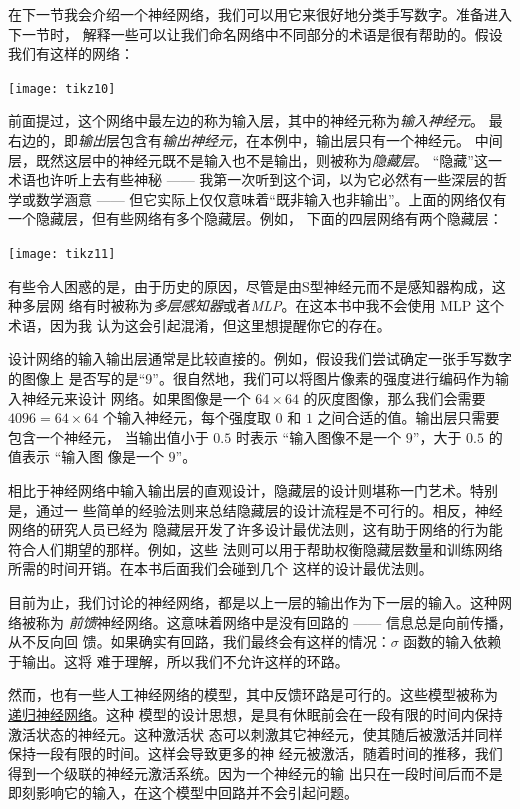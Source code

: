 在下一节我会介绍一个神经网络，我们可以用它来很好地分类手写数字。准备进入下一节时，
解释一些可以让我们命名网络中不同部分的术语是很有帮助的。假设我们有这样的网络：
\begin{center}
  \texttt{[image: tikz10]}
\end{center}

前面提过，这个网络中最左边的称为输入层，其中的神经元称为\emph{输入神经元}。
最右边的，即\emph{输出}层包含有\emph{输出神经元}，在本例中，输出层只有一个神经元。
中间层，既然这层中的神经元既不是输入也不是输出，则被称为\emph{隐藏层}。
“隐藏”这一术语也许听上去有些神秘 —— 我第一次听到这个词，以为它必然有一些深层的哲学或数学涵意 —— 
但它实际上仅仅意味着“既非输入也非输出”。上面的网络仅有一个隐藏层，但有些网络有多个隐藏层。例如，
下面的四层网络有两个隐藏层：
\begin{center}
  \texttt{[image: tikz11]}
\end{center}

有些令人困惑的是，由于历史的原因，尽管是由S型神经元而不是感知器构成，这种多层网
络有时被称为\emph{多层感知器}或者\emph{MLP}。在这本书中我不会使用 MLP 这个术语，因为我
认为这会引起混淆，但这里想提醒你它的存在。

设计网络的输入输出层通常是比较直接的。例如，假设我们尝试确定一张手写数字的图像上
是否写的是“9”。很自然地，我们可以将图片像素的强度进行编码作为输入神经元来设计
网络。如果图像是一个 $64 \times 64$ 的灰度图像，那么我们会需要 $4096 = 64 \times
64$ 个输入神经元，每个强度取 $0$ 和 $1$ 之间合适的值。输出层只需要包含一个神经元，
当输出值小于 $0.5$ 时表示 “输入图像不是一个 $9$”，大于 $0.5$ 的值表示 “输入图
像是一个 $9$”。

相比于神经网络中输入输出层的直观设计，隐藏层的设计则堪称一门艺术。特别是，通过一
些简单的经验法则来总结隐藏层的设计流程是不可行的。相反，神经网络的研究人员已经为
隐藏层开发了许多设计最优法则，这有助于网络的行为能符合人们期望的那样。例如，这些
法则可以用于帮助权衡隐藏层数量和训练网络所需的时间开销。在本书后面我们会碰到几个
这样的设计最优法则。

目前为止，我们讨论的神经网络，都是以上一层的输出作为下一层的输入。这种网络被称为
\emph{前馈}神经网络。这意味着网络中是没有回路的 —— 信息总是向前传播，从不反向回
馈。如果确实有回路，我们最终会有这样的情况：$\sigma$ 函数的输入依赖于输出。这将
难于理解，所以我们不允许这样的环路。

然而，也有一些人工神经网络的模型，其中反馈环路是可行的。这些模型被称为%
\href{http://en.wikipedia.org/wiki/Recurrent_neural_network}{递归神经网络}。这种
模型的设计思想，是具有休眠前会在一段有限的时间内保持激活状态的神经元。这种激活状
态可以刺激其它神经元，使其随后被激活并同样保持一段有限的时间。这样会导致更多的神
经元被激活，随着时间的推移，我们得到一个级联的神经元激活系统。因为一个神经元的输
出只在一段时间后而不是即刻影响它的输入，在这个模型中回路并不会引起问题。

